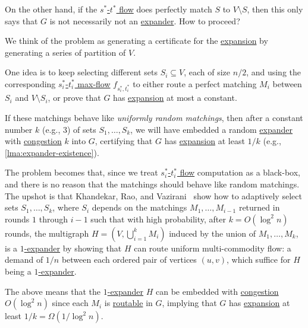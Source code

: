 On the other hand, if the \hyperref[prb:s-t-max-flow]{\(s^{\ast} \)-\(t^{\ast} \) flow} does perfectly match \(S\) to \(V\setminus S\), then this only says that \(G\) is not necessarily not an \hyperref[def:expander]{expander}. How to proceed?

\begin{intuition}
	We think of the problem as generating a certificate for the \hyperref[def:expansion]{expansion} by generating a series of partition of \(V\).
\end{intuition}

One idea is to keep selecting different sets \(S_i \subseteq V\), each of size \(n / 2\), and using the corresponding \hyperref[prb:s-t-max-flow]{\(s^{\ast} _i\)-\(t^{\ast} _i\) max-flow} \(f_{s^{\ast}_i , t^{\ast}_i }\) to either route a perfect matching \(M_i\) between \(S_i\) and \(V\setminus S_i\), or prove that \(G\) has \hyperref[def:expansion]{expansion} at most a constant.

\begin{intuition}
	If these matchings behave like \emph{uniformly random matchings}, then after a constant number \(k\) (e.g., \(3\)) of sets \(S_1, \dots , S_k\), we will have embedded a random \hyperref[def:expander]{expander} with \hyperref[def:congestion]{congestion} \(k\) into \(G\), certifying that \(G\) has \hyperref[def:expansion]{expansion} at least \(1 / k\) (e.g., \autoref{lma:expander-existence}).
\end{intuition}

The problem becomes that, since we treat \hyperref[prb:s-t-max-flow]{\(s^{\ast}_i\)-\(t^{\ast} _i\) flow} computation as a black-box, and there is no reason that the matchings should behave like random matchings. The upshot is that Khandekar, Rao, and Vazirani~\cite{khandekar2009graph} show how to adaptively select sets \(S_1, \dots , S_k\), where \(S_i\) depends on the matchings \(M_1, \dots , M_{i-1}\) returned in rounds \(1\) through \(i-1\) such that with high probability, after \(k = O(\log ^2 n)\) rounds, the multigraph \(H = (V, \bigcup_{i=1}^{k} M_i)\) induced by the union of \(M_1, \dots , M_k\), is a \hyperref[def:expander]{\(1\)-expander} by showing that \(H\) can route uniform multi-commodity flow: a demand of \(1 / n\) between each ordered pair of vertices \((u, v)\), which suffice for \(H\) being a \hyperref[def:expander]{\(1\)-expander}.

\begin{remark}
	The above means that the \hyperref[def:expander]{\(1\)-expander} \(H\) can be embedded with \hyperref[def:congestion]{congestion} \(O(\log ^2 n)\) since each \(M_i\) is \hyperref[def:routable]{routable} in \(G\), implying that \(G\) has \hyperref[def:expansion]{expansion} at least \(1 / k = \Omega (1 / \log ^2 n)\).
\end{remark}

